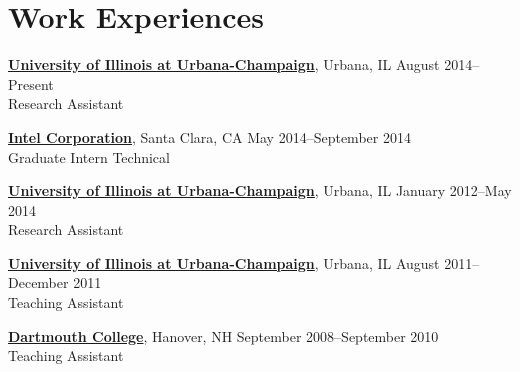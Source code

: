 \section{\sc Work Experiences}
{\href{http://www.illinois.edu/}{{\bf University of Illinois at Urbana-Champaign}}}, Urbana, IL \hfill August 2014--Present\\
Research Assistant

{\href{http://www.intel.com/}{{\bf Intel Corporation}}}, Santa Clara, CA \hfill May 2014--September 2014\\
Graduate Intern Technical

{\href{http://www.illinois.edu/}{{\bf University of Illinois at Urbana-Champaign}}}, Urbana, IL \hfill January 2012--May 2014\\
Research Assistant

{\href{http://www.illinois.edu/}{{\bf University of Illinois at Urbana-Champaign}}}, Urbana, IL \hfill August 2011--December 2011\\
Teaching Assistant

{\href{http://www.dartmouth.edu/}{{\bf Dartmouth College}}}, Hanover, NH \hfill September 2008--September 2010\\
Teaching Assistant
